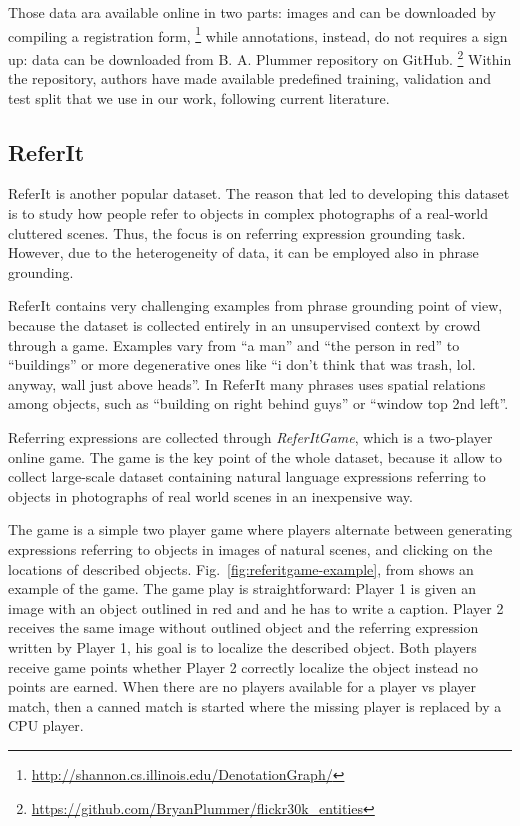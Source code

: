Those data ara available online in two parts: images and can be
downloaded by compiling a registration form,
\footnote{\href{http://shannon.cs.illinois.edu/DenotationGraph/}{http://shannon.cs.illinois.edu/DenotationGraph/}}
while annotations, instead, do not requires a sign up: data can be
downloaded from B. A. Plummer repository on GitHub.
\footnote{\href{https://github.com/BryanPlummer/flickr30k\_entities}{https://github.com/BryanPlummer/flickr30k\_entities}}
Within the repository, authors have made available predefined
training, validation and test split that we use in our work, following
current literature.

\subsection{ReferIt}
\label{subsec:referit}

ReferIt \cite{kazemzadeh2014referitgame} is another popular dataset.
The reason that led to developing this dataset is to study how people
refer to objects in complex photographs of a real-world cluttered
scenes. Thus, the focus is on referring expression grounding task.
However, due to the heterogeneity of data, it can be employed also in
phrase grounding.

ReferIt contains very challenging examples from phrase grounding point
of view, because the dataset is collected entirely in an unsupervised
context by crowd through a game. Examples vary from ``a man'' and
``the person in red'' to ``buildings'' or more degenerative ones like
``i don't think that was trash, lol. anyway, wall just above heads''.
In ReferIt many phrases uses spatial relations among objects, such as
``building on right behind guys'' or ``window top 2nd left''.

Referring expressions are collected through \textit{ReferItGame},
which is a two-player online game. The game is the key point of the
whole dataset, because it allow to collect large-scale dataset
containing natural language expressions referring to objects in
photographs of real world scenes in an inexpensive way.

The game is a simple two player game where players alternate between
generating expressions referring to objects in images of natural
scenes, and clicking on the locations of described objects.
Fig.~\ref{fig:referitgame-example}, from
\cite{kazemzadeh2014referitgame} shows an example of the game. The
game play is straightforward: Player 1 is given an image with an
object outlined in red and and he has to write a caption. Player 2
receives the same image without outlined object and the referring
expression written by Player 1, his goal is to localize the described
object. Both players receive game points whether Player 2 correctly
localize the object instead no points are earned. When there are no
players available for a player vs player match, then a canned match is
started where the missing player is replaced by a CPU player.

